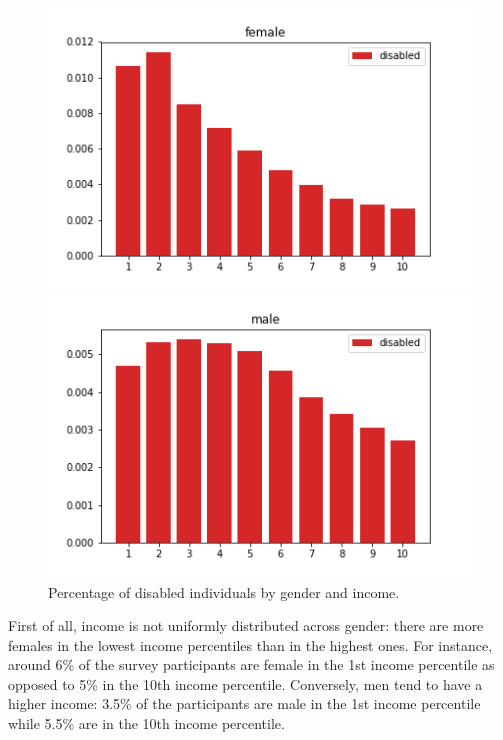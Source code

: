 \documentclass[\main/main.tex]{subfiles}
\begin{document}
\begin{figure}[H]
    \centering
    \begin{minipage}{.5\textwidth}
        \centering
        \includegraphics[scale=.5]{images/disability_only_female.png}
    \end{minipage}%
   \begin{minipage}{.5\textwidth}
        \centering
        \includegraphics[scale=.5]{images/disability_only_male.png}
    \end{minipage}
    \caption{Percentage of disabled individuals by gender and income.}
    \label{fig:disability_True}
\end{figure}

First of all, income is not uniformly distributed across gender: there are more females in the lowest income percentiles than in the highest ones. For instance, around 6\% of the survey participants are female in the 1st income percentile as opposed to 5\% in the 10th income percentile. Conversely, men tend to have a higher income: 3.5\% of the participants are male in the 1st income percentile while 5.5\% are in the 10th income percentile. \\
\end{document}
